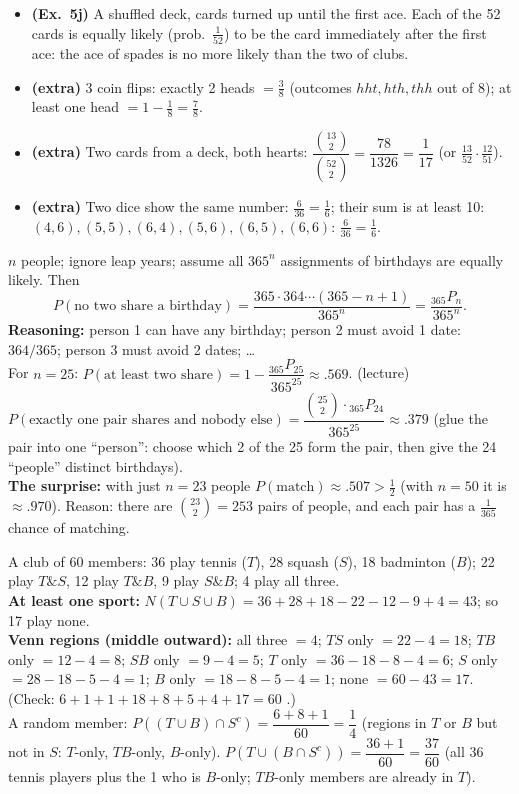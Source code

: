 \documentclass[11pt]{article}
\begin{document}
\begin{exbox}
\begin{itemize}
\item \textbf{(Ex.\ 5j)} A shuffled deck, cards turned up until the first ace. Each of the 52 cards is equally likely (prob.\ $\tfrac1{52}$) to be the card immediately after the first ace: the ace of spades is no more likely than the two of clubs.
\item \textbf{(extra)} 3 coin flips: exactly 2 heads $=\tfrac38$ (outcomes $hht,hth,thh$ out of 8); at least one head $=1-\tfrac18=\tfrac78$.
\item \textbf{(extra)} Two cards from a deck, both hearts: $\dfrac{\binom{13}2}{\binom{52}2}=\dfrac{78}{1326}=\dfrac1{17}$ (or $\tfrac{13}{52}\cdot\tfrac{12}{51}$).
\item \textbf{(extra)} Two dice show the same number: $\tfrac6{36}=\tfrac16$; their sum is at least 10: $(4,6),(5,5),(6,4),(5,6),(6,5),(6,6)$: $\tfrac6{36}=\tfrac16$.
\end{itemize}
\end{exbox}

\begin{exbox}
$n$ people; ignore leap years; assume all $365^n$ assignments of birthdays are equally likely. Then
\[ P(\text{no two share a birthday})=\frac{365\cdot364\cdots(365-n+1)}{365^n}=\frac{{}_{365}P_n}{365^n}. \]
\textbf{Reasoning:} person 1 can have any birthday; person 2 must avoid 1 date: $364/365$; person 3 must avoid 2 dates; \dots\\
For $n=25$: $P(\text{at least two share})=1-\dfrac{{}_{365}P_{25}}{365^{25}}\approx.569$. (lecture) $P(\text{exactly one pair shares and nobody else})=\dfrac{\binom{25}2\cdot{}_{365}P_{24}}{365^{25}}\approx.379$ (glue the pair into one ``person'': choose which 2 of the 25 form the pair, then give the 24 ``people'' distinct birthdays).\\
\textbf{The surprise:} with just $n=23$ people $P(\text{match})\approx.507>\tfrac12$ (with $n=50$ it is $\approx.970$). Reason: there are $\binom{23}2=253$ pairs of people, and each pair has a $\tfrac1{365}$ chance of matching.
\end{exbox}

\begin{exbox}
A club of 60 members: 36 play tennis ($T$), 28 squash ($S$), 18 badminton ($B$); 22 play $T\&S$, 12 play $T\&B$, 9 play $S\&B$; 4 play all three.\\
\textbf{At least one sport:} $N(T\cup S\cup B)=36+28+18-22-12-9+4=43$; so 17 play none.\\
\textbf{Venn regions (middle outward):} all three $=4$; $TS$ only $=22-4=18$; $TB$ only $=12-4=8$; $SB$ only $=9-4=5$; $T$ only $=36-18-8-4=6$; $S$ only $=28-18-5-4=1$; $B$ only $=18-8-5-4=1$; none $=60-43=17$. (Check: $6+1+1+18+8+5+4+17=60$ \checkmark.)\\
A random member: $P((T\cup B)\cap S^c)=\dfrac{6+8+1}{60}=\dfrac14$ (regions in $T$ or $B$ but not in $S$: $T$-only, $TB$-only, $B$-only). $P(T\cup(B\cap S^c))=\dfrac{36+1}{60}=\dfrac{37}{60}$ (all 36 tennis players plus the 1 who is $B$-only; $TB$-only members are already in $T$).
\end{exbox}
\end{document}
